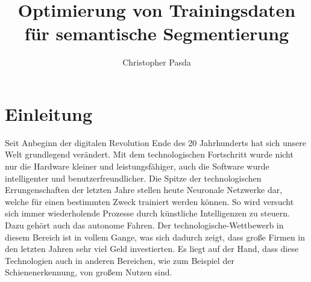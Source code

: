 \documentclass[11pt]{scrartcl}
\title{Optimierung von Trainingsdaten für semantische Segmentierung}
\author{Christopher Pasda}
\begin{document}
\maketitle
\tableofcontents

\newpage

\section{Einleitung}
\label{sec:Einleitung}

\noindent
Seit Anbeginn der digitalen Revolution Ende des 20 Jahrhunderts hat sich unsere Welt grundlegend verändert. Mit dem technologischen Fortschritt wurde nicht nur die Hardware kleiner und leistungsfähiger, auch die Software wurde intelligenter und benutzerfreundlicher. Die Spitze der technologischen Errungenschaften der letzten Jahre stellen heute Neuronale Netzwerke dar, welche für einen bestimmten Zweck trainiert werden können. So wird versucht sich immer wiederholende Prozesse durch künstliche Intelligenzen zu steuern. Dazu gehört auch das autonome Fahren. Der technologische-Wettbewerb in diesem Bereich ist in vollem Gange, was sich dadurch zeigt, dass große Firmen in den letzten Jahren  sehr viel Geld investierten. Es liegt auf der Hand, dass diese Technologien auch in anderen Bereichen, wie zum Beispiel der Schienenerkennung, von großem Nutzen sind. 
\end{document}
